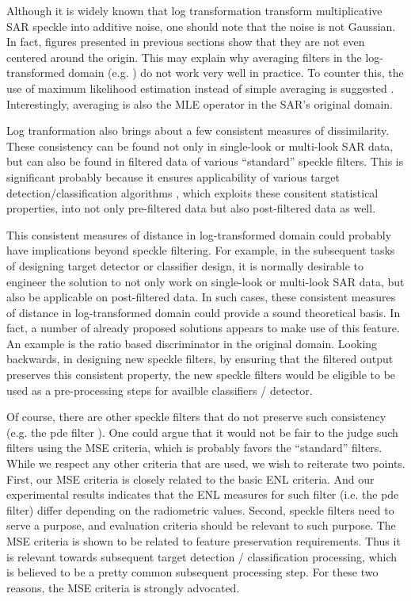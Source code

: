 \documentclass[journal]{IEEEtran}
\begin{document}
Although it is widely known that log transformation transform multiplicative SAR speckle into additive noise, 
	one should note that the noise is not Gaussian.
In fact, figures presented in previous sections show that 
	they are not even centered around the origin. 
This may explain why averaging filters in the log-transformed domain (e.g. \cite{Arsenault_JOptSocAm_1976}) do not work very well in practice.
To counter this, the use of maximum likelihood estimation instead of simple averaging is suggested \cite{Le_2011_ACRS}. 
Interestingly, averaging is also the MLE operator in the SAR's original domain.

Log tranformation also brings about a few consistent measures of dissimilarity.
These consistency can be found not only in single-look or multi-look SAR data, 
	but can also be found in filtered data of various ``standard'' speckle filters.
This is significant probably because it ensures applicability of various target detection/classification algorithms
	, which exploits these consitent statistical properties, 
	into not only pre-filtered data but also post-filtered data as well.

This consistent measures of distance in log-transformed domain could probably have implications beyond speckle filtering.
For example, in the subsequent tasks of designing target detector or classifier design, 
	it is normally desirable to engineer the solution to not only work on single-look or multi-look SAR data,
	but also be applicable on post-filtered data.
In such cases, these consistent measures of distance in log-transformed domain could provide a sound theoretical basis.
In fact, a number of already proposed solutions appears to make use of this feature. 
An example is the ratio based discriminator in the original domain.
Looking backwards, in designing new speckle filters, by ensuring that the filtered output preserves this consistent property,
	the new speckle filters would be eligible to be used as a pre-processing steps for availble classifiers / detector.

Of course, there are other speckle filters that do not preserve such consistency (e.g. the pde filter \cite{You_TIP_2000}).
One could argue that it would not be fair to the judge such filters using the MSE criteria, 
	which is probably favors the ``standard'' filters.
While we respect any other criteria that are used, we wish to reiterate two points.
First, our MSE criteria is closely related to the basic ENL criteria.
And our experimental results indicates that the ENL measures for such filter (i.e. the pde filter) differ depending on the radiometric values.
Second, speckle filters need to serve a purpose, and evaluation criteria should be relevant to such purpose.
The MSE criteria is shown to be related to feature preservation requirements.
Thus it is relevant towards subsequent target detection / classification processing, 
	which is believed to be a pretty common subsequent processing step.
For these two reasons, the MSE criteria is strongly advocated.
\end{document}
